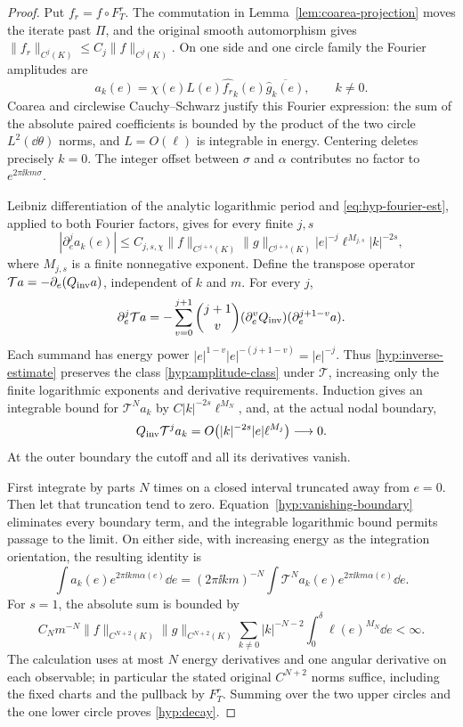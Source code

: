 \begin{proof}
Put $f_r=f\circ F_T^r$.  The commutation in
Lemma~\ref{lem:coarea-projection} moves the iterate past $\Pi$, and
the original smooth automorphism gives
$\|f_r\|_{C^j(K)}\le C_j\|f\|_{C^j(K)}$.
On one side and one circle family the Fourier amplitudes are
\[
 a_k(e)=\chi(e)L(e)\widehat{f_r}_k(e)
                           \overline{\widehat g_k(e)},\qquad k\ne0.
\]
Coarea and circlewise Cauchy--Schwarz justify this Fourier expression:
the sum of the absolute paired coefficients is bounded by the product
of the two circle $L^2(\dd\theta)$ norms, and $L=O(\ell)$ is
integrable in energy.  Centering deletes precisely $k=0$.
The integer offset between $\sigma$ and $\alpha$ contributes no factor
to $e^{2\pi\ii km\sigma}$.

Leibniz differentiation of the analytic logarithmic period and
\eqref{eq:hyp-fourier-est}, applied to both Fourier factors, gives
for every finite $j,s$
\begin{equation}\label{hyp:amplitude-class}
 |\partial_e^j a_k(e)|\le
 C_{j,s,\chi}\|f\|_{C^{j+s}(K)}\|g\|_{C^{j+s}(K)}
       |e|^{-j}\ell^{M_{j,s}}|k|^{-2s},
\end{equation}
where $M_{j,s}$ is a finite nonnegative exponent.  Define the transpose
operator $\mathcal T a=-\partial_e(Q_{\rm inv}a)$, independent of
$k$ and $m$.  For every $j$,
\[
 \partial_e^j\mathcal T a
 =-\sum_{v=0}^{j+1}\binom{j+1}{v}
     (\partial_e^vQ_{\rm inv})(\partial_e^{j+1-v}a).
\]
Each summand has energy power
$|e|^{1-v}|e|^{-(j+1-v)}=|e|^{-j}$.
Thus \eqref{hyp:inverse-estimate} preserves the class
\eqref{hyp:amplitude-class} under $\mathcal T$, increasing only the
finite logarithmic exponents and derivative requirements.  Induction
gives an integrable bound for $\mathcal T^Na_k$ by
$C|k|^{-2s}\ell^{M_N}$, and, at the actual nodal boundary,
\begin{equation}\label{hyp:vanishing-boundary}
 Q_{\rm inv}\mathcal T^ja_k
      =O\bigl(|k|^{-2s}|e|\ell^{M_j}\bigr)\longrightarrow0.
\end{equation}
At the outer boundary the cutoff and all its derivatives vanish.

First integrate by parts $N$ times on a closed interval truncated
away from $e=0$.  Then let that truncation tend to zero.
Equation~\eqref{hyp:vanishing-boundary} eliminates every boundary
term, and the integrable logarithmic bound permits passage to the
limit.  On either side, with increasing energy as the integration
orientation, the resulting identity is
\begin{equation}\label{hyp:transpose-identity}
 \int a_k(e)e^{2\pi\ii km\alpha(e)}\dd e
 =(2\pi\ii km)^{-N}
     \int\mathcal T^Na_k(e)e^{2\pi\ii km\alpha(e)}\dd e.
\end{equation}
For $s=1$, the absolute sum is bounded by
\[
 C_Nm^{-N}\|f\|_{C^{N+2}(K)}\|g\|_{C^{N+2}(K)}
 \sum_{k\ne0}|k|^{-N-2}\int_0^\delta\ell(e)^{M_N}\dd e<\infty.
\]
The calculation uses at most $N$ energy derivatives and one angular
derivative on each observable; in particular the stated original
$C^{N+2}$ norms suffice, including the fixed charts and the pullback
by $F_T^r$.  Summing over the two upper circles and the one lower
circle proves \eqref{hyp:decay}.
\end{proof}

